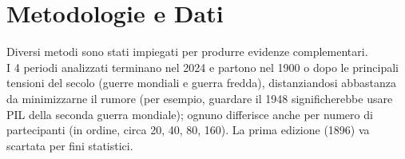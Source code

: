 \section{Metodologie e Dati}\label{sec:methods}



Diversi metodi sono stati impiegati per produrre evidenze complementari.\\
I 4 periodi analizzati terminano nel 2024 e partono nel 1900 o dopo le
principali tensioni del secolo (guerre mondiali e guerra fredda), distanziandosi
abbastanza da minimizzarne il rumore (per esempio, guardare il 1948
significherebbe usare PIL della seconda guerra mondiale); ognuno differisce
anche per numero di partecipanti (in ordine, circa 20, 40, 80, 160). La prima
edizione (1896) va scartata per fini statistici.\\



